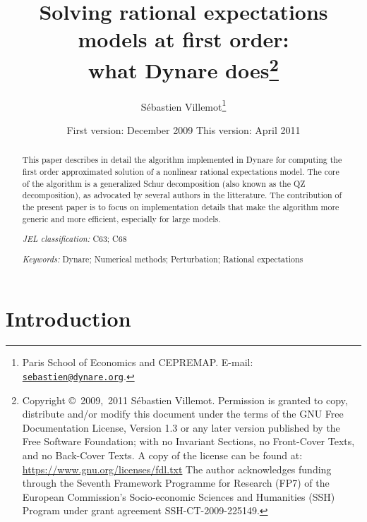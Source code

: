 \documentclass[11pt,a4paper]{article}
\begin{document}
\author{S\'ebastien Villemot\thanks{Paris School of Economics and
    CEPREMAP. E-mail:
    \href{mailto:sebastien@dynare.org}{\texttt{sebastien@dynare.org}}.}}

\title{Solving rational expectations models at first order: \\
  what Dynare does\thanks{Copyright \copyright~2009,~2011 S\'ebastien
    Villemot. Permission is granted to copy, distribute and/or modify
    this document under the terms of the GNU Free Documentation
    License, Version 1.3 or any later version published by the Free
    Software Foundation; with no Invariant Sections, no Front-Cover
    Texts, and no Back-Cover Texts. A copy of the license can be found
    at: \url{https://www.gnu.org/licenses/fdl.txt}
    \newline
    The author acknowledges funding through the Seventh Framework Programme
    for Research (FP7) of the European Commission's Socio-economic Sciences and
    Humanities (SSH) Program under grant agreement SSH-CT-2009-225149.}
}

\date{First version: December 2009 \hspace{1cm} This version: April 2011}
\maketitle

\begin{abstract}
  This paper describes in detail the algorithm implemented in Dynare for
  computing the first order approximated solution of a nonlinear rational
  expectations model. The core of the algorithm is a generalized Schur
  decomposition (also known as the QZ decomposition), as advocated by several
  authors in the litterature. The contribution of the present paper is to focus
  on implementation details that make the algorithm more generic and more
  efficient, especially for large models.

  \medskip
  \noindent
  \textit{JEL classification:} C63; C68

  \medskip
  \noindent
  \textit{Keywords:} Dynare; Numerical methods; Perturbation; Rational
  expectations

\end{abstract}

\section{Introduction}
\end{document}
